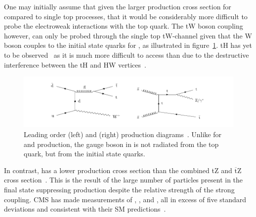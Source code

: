 One may initially assume that given the larger production cross section for \ttbar compared to single top processes, that it would be considerably more difficult to probe the electroweak interactions with the top quark.
The tW boson coupling however, can only be probed through the single top tW-channel given that the W boson couples to the initial state quarks for \ttW, as illustrated in figure~\ref{fig:feyn_ttV}.
tH has yet to be observed~\cite{CMS:2018jsz} as it is much more difficult to access than \ttH due to the destructive interference between the tH and HW vertices~\cite{Maltoni:2001hu}.




\begin{figure}[htbp]
\centering
\includegraphics[width=\textwidth]{figs/top-physics/CMS-TOP-17-005_Figure_001.pdf}
\caption{Leading order \ttW (left) and \ttZ (right) production diagrams~\cite{Sirunyan:2017uzs}. Unlike for \ttZ and \ttH production, the gauge boson in \ttW is not radiated from the top quark, but from the initial state quarks.}
\label{fig:feyn_ttV}
\end{figure}

In contrast, \ttZ has a lower production cross section than the combined tZ and $\overline{\text{t}}$Z cross section~\cite{Campbell:2013yla}.
This is the result of the large number of particles present in the \ttZ final state suppressing \ttZ production despite the relative strength of the strong coupling.
CMS has made measurements of \ttH, \ttW, and \ttZ, all in excess of five standard deviations and consistent with their SM predictions~\cite{Sirunyan:2017uzs,Sirunyan:2018hoz}.


